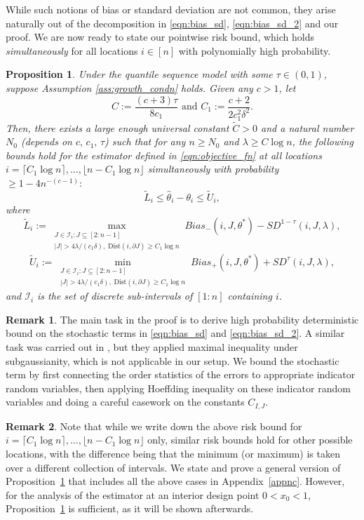 \documentclass[11pt]{article}
\theoremstyle{plain}
\newtheorem{proposition}{Proposition}
\theoremstyle{definition}
\newtheorem{remark}{Remark}
\theoremstyle{remark}
\begin{document}
While such notions of bias or standard deviation are not common, they arise naturally out of the decomposition in \eqref{eqn:bias_sd}, \eqref{eqn:bias_sd_2} and our proof. We are now ready to state our pointwise risk bound, which holds \textit{simultaneously} for all locations $i\in [n]$ with polynomially high probability.
\begin{proposition}\label{prop:ptwise_error_bound_interior}
 Under the quantile sequence model with some $\tau \in (0,1)$, suppose Assumption \ref{ass:growth_condn} holds. Given any $c>1$, let $$C:=\frac{(c+3)\tau}{8c_1} \text{ and }C_1:=\frac{c+2}{2c_1^2\delta^2}.$$
   Then, there exists a large enough universal constant $\tilde{C}>0$ and a natural number $N_0$ (depends on $c,\, c_1,\,\tau$) such that for any $n\geq N_0$ and $\lambda\geq C\log n$, the following bounds hold for the estimator defined in \eqref{eqn:objective_fn} at \textit{all locations} $i=\lceil C_1 \log n\rceil,\ldots,  \lfloor n-C_1 \log n\rfloor$ \textit{simultaneously} with probability $\geq 1-4n^{-(c-1)}:$
    \[\tilde{L}_i\leq \hat{\theta}_i-\theta_i\leq \tilde{U}_i,\]
    where
    \[\tilde{L}_i:=\max_{\substack{J \in \mathcal{I}_i: J \subseteq [2:n-1] \\ |J| > 4\lambda/(c_1\delta),\; \text{Dist}(i, \partial J) \ge C_1 \log n}} Bias_-(i,J,\theta^*)-SD^{1-\tau}(i,J,\lambda),\]
    \[\tilde{U}_i:=\min_{\substack{J \in \mathcal{I}_i: J \subseteq [2:n-1] \\ |J| > 4\lambda/(c_1\delta),\; \text{Dist}(i, \partial J) \ge C_1 \log n}} Bias_+(i,J,\theta^*)+SD^{\tau}(i,J,\lambda),\]
and $\mathcal{I}_i$ is the set of discrete sub-intervals of $[1:n]$ containing $i$.
\end{proposition}
\begin{remark}
    The main task in the proof is to derive high probability deterministic bound on the stochastic terms in \eqref{eqn:bias_sd} and \eqref{eqn:bias_sd_2}. A similar task was carried out in \cite{chatterjee2026minmaxtrendfilteringgeneralizations}, but they applied maximal inequality under subgaussianity, which is not applicable in our setup. We bound the stochastic term by first connecting the order statistics of the errors to appropriate indicator random variables, then applying Hoeffding inequality on these indicator random variables and doing a careful casework on the constants $C_{I,J}$.
\end{remark}
\begin{remark}
    Note that while we write down the above risk bound for $i=\lceil C_1 \log n\rceil,\ldots,  \lfloor n-C_1 \log n\rfloor$ only, similar risk bounds hold for other possible locations, with the difference being that the minimum (or maximum) is taken over a different collection of intervals. We state and prove a general version of Proposition~\ref{prop:ptwise_error_bound_interior} that includes all the above cases in Appendix~\ref{appnc}. However, for the analysis of the estimator at an interior design point $0<x_0<1$, Proposition~\ref{prop:ptwise_error_bound_interior} is sufficient, as it will be shown afterwards.
\end{remark}
\end{document}
